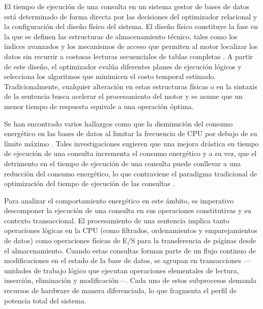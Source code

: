 \documentclass[12pt, letter paper]{report}
\begin{document}
      El tiempo de ejecución de una consulta en un sistema gestor de bases de
      datos está determinado de forma directa por las decisiones del optimizador
      relacional y la configuración del diseño físico del sistema. El diseño
      físico constituye la fase en la que se definen las estructuras de
      almacenamiento técnico, tales  como los índices avanzados y los mecanismos
      de acceso que permiten al motor localizar los datos sin recurrir a
      costosas lecturas secuenciales de tablas completas
      \cite{silberschatz2019database, elmasri2016fundamentals,
      connolly2014database, ramakrishnan2003database}. A partir de este diseño,
      el optimizador evalúa diferentes planes de ejecución lógicos y selecciona
      los algoritmos que minimicen el costo temporal estimado. Tradicionalmente,
      cualquier alteración en estas estructuras físicas o en la sintaxis de la
      sentencia busca acelerar el procesamiento del motor y se asume que un
      menor tiempo de respuesta equivale a una operación óptima.

      Se han encontrado varios hallazgos como que la disminución del consumo
      energético en las bases de datos al limitar la frecuencia de CPU por
      debajo de su límite máximo \cite{xuexploring2010}. Tales investigaciones
      sugieren que una mejora drástica en tiempo de ejecución de una consulta
      incrementa el consumo energético \cite{langtowards2009} y a su vez, que el
      detrimento en el tiempo de ejecución de una consulta puede conllevar a una
      reducción del consumo energético, lo que contraviene el paradigma
      tradicional de optimización del tiempo de ejecución de las consultas
      \cite{langrethinking2011}.

      Para analizar el comportamiento energético en este ámbito, es imperativo
      descomponer la ejecución de una consulta en sus operaciones constitutivas
      y su contexto transaccional. El procesamiento de una sentencia implica
      tanto operaciones lógicas en la CPU (como filtrados, ordenamientos y
      emparejamientos de datos) como operaciones físicas de E/S para la
      transferencia de páginas desde el almacenamiento. Cuando estas consultas
      forman parte de  un flujo continuo de modificaciones en el estado de la
      base de datos, se agrupan en transacciones ---unidades de trabajo lógico
      que ejecutan operaciones elementales de lectura, inserción, eliminación y
      modificación---. Cada uno de estos subprocesos demanda recursos de
      hardware de manera diferenciada, lo que fragmenta el perfil de potencia
      total del sistema.
\end{document}

